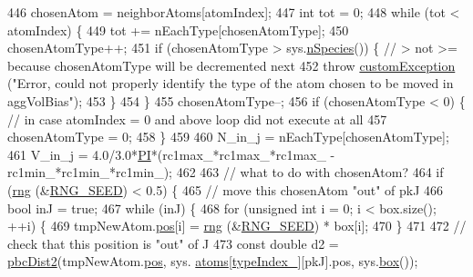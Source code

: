 \begin{DoxyCode}
446             chosenAtom = neighborAtoms[atomIndex];
447         \textcolor{keywordtype}{int} tot = 0;
448             \textcolor{keywordflow}{while} (tot < atomIndex) \{
449                 tot += nEachType[chosenAtomType];
450                 chosenAtomType++;
451                     \textcolor{keywordflow}{if} (chosenAtomType > sys.\hyperlink{classsim_system_ab5e2e9b6204de15520302fe1d51688dd}{nSpecies}()) \{ \textcolor{comment}{// > not >= because chosenAtomType will
       be decremented next}
452                         \textcolor{keywordflow}{throw} \hyperlink{classcustom_exception}{customException} (\textcolor{stringliteral}{"Error, could not properly identify the type
       of the atom chosen to be moved in aggVolBias"});
453                     \}
454             \}
455             chosenAtomType--;
456             \textcolor{keywordflow}{if} (chosenAtomType < 0) \{ \textcolor{comment}{// in case atomIndex = 0 and above loop did not execute at all}
457                     chosenAtomType = 0;
458             \}
459 
460         N\_in\_j = nEachType[chosenAtomType];
461         V\_in\_j = 4.0/3.0*\hyperlink{global_8h_a598a3330b3c21701223ee0ca14316eca}{PI}*(rc1max\_*rc1max\_*rc1max\_ - rc1min\_*rc1min\_*rc1min\_);
462 
463         \textcolor{comment}{// what to do with chosenAtom?}
464         \textcolor{keywordflow}{if} (\hyperlink{utilities_8cpp_a0f9542af4b475ac79cb679d7a8d14db0}{rng} (&\hyperlink{global_8h_a3f4e4ea24d5a5c66feae55d1f329c884}{RNG\_SEED}) < 0.5) \{
465                     \textcolor{comment}{// move this chosenAtom "out" of pkJ}
466                     \textcolor{keywordtype}{bool} inJ = \textcolor{keyword}{true};
467                     \textcolor{keywordflow}{while} (inJ) \{
468                         \textcolor{keywordflow}{for} (\textcolor{keywordtype}{unsigned} \textcolor{keywordtype}{int} i = 0; i < box.size(); ++i) \{
469                                 tmpNewAtom.\hyperlink{classatom_a3ae5f4880e7831d8b2c9fda72b4eb24a}{pos}[i] = \hyperlink{utilities_8cpp_a0f9542af4b475ac79cb679d7a8d14db0}{rng} (&\hyperlink{global_8h_a3f4e4ea24d5a5c66feae55d1f329c884}{RNG\_SEED}) * box[i];
470                         \}
471 
472                         \textcolor{comment}{// check that this position is "out" of J}
473                         \textcolor{keyword}{const} \textcolor{keywordtype}{double} d2 = \hyperlink{utilities_8cpp_abb1db3a8a3ac46e044bbe7b2c5684c0a}{pbcDist2}(tmpNewAtom.\hyperlink{classatom_a3ae5f4880e7831d8b2c9fda72b4eb24a}{pos}, sys.
      \hyperlink{classsim_system_a90421b19082f7fb8fc23b7264b1161e4}{atoms}[\hyperlink{classmc_move_acb731965547b0326ef318ec96da8b46a}{typeIndex\_}][pkJ].pos, sys.\hyperlink{classsim_system_a8bff9dfb95b1b09a0fab2c1c485ade07}{box}());

\end{DoxyCode}
